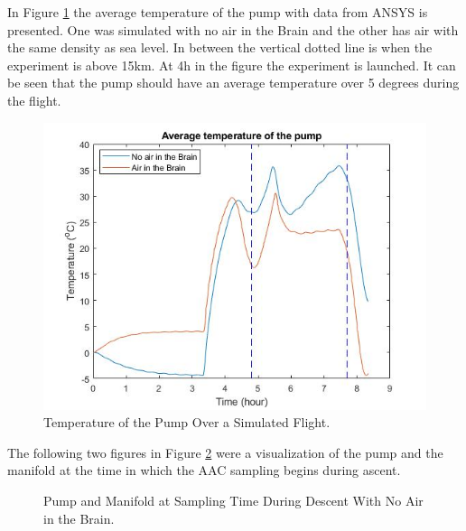 In Figure \ref{fig:test-flight-AAC-4-6} the average temperature of the pump with data from ANSYS is presented. One was simulated with no air in the Brain and the other has air with the same density as sea level. In between the vertical dotted line is when the experiment is above 15km. At 4h in the figure the experiment is launched. It can be seen that the pump should have an average temperature over 5 degrees during the flight.
\begin{figure}[H]
    \centering
    \includegraphics[width=\textwidth]{4-experiment-design/img/Thermal/pump-temperature-air-no-air.jpg}
    \caption{Temperature of the Pump Over a Simulated Flight.}
    \label{fig:test-flight-AAC-4-6}
\end{figure}

The following two figures in Figure \ref{fig:Pump-Valve-ascent-sample-4-6} were a visualization of the pump and the manifold at the time in which the AAC sampling begins during ascent. 
\begin{figure}[H]
    \centering
    \hifll
    \caption{Pump and Manifold at Sampling Time During Descent With No Air in the Brain.}
    \label{fig:Pump-Valve-ascent-sample-4-6}
\end{figure}

